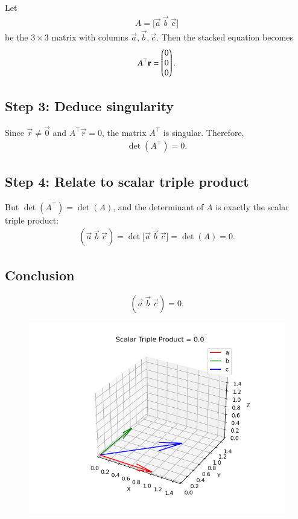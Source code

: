 \documentclass[journal]{IEEEtran}
\begin{document}
Let 
\begin{align}
A = \big[\vec a\ \vec b\ \vec c\big]
\end{align}
be the \(3\times 3\) matrix with columns \(\vec a,\vec b,\vec c\).  
Then the stacked equation becomes
\begin{align}
A^\top \mathbf r = \begin{pmatrix}0\\0\\0\end{pmatrix}.
\end{align}

\subsection*{Step 3: Deduce singularity}

Since \(\vec r \neq \vec 0\) and \(A^\top \vec r = 0\), the matrix \(A^\top\) is singular. Therefore,
\begin{align}
\det(A^\top) = 0.
\end{align}

\subsection*{Step 4: Relate to scalar triple product}

But \(\det(A^\top) = \det(A)\), and the determinant of \(A\) is exactly the scalar triple product:
\begin{align}
(\vec a\ \vec b\ \vec c) = \det\big[\vec a\ \vec b\ \vec c\big] = \det(A) = 0.
\end{align}

\subsection*{Conclusion}

\[
\boxed{(\vec a\ \vec b\ \vec c) = 0}.
\]


\begin{figure}[h]
    \centering
    \includegraphics[width=0.9\columnwidth]{figs/fig41.png}
    \caption{}
    \label{fig:placeholder}
\end{figure}
\end{document}
